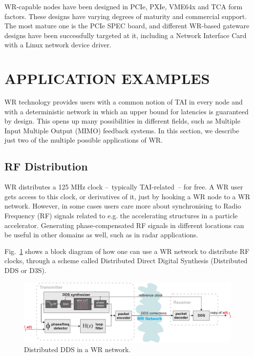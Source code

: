 \documentclass{../JAC2003}
\begin{document}
WR-capable nodes have been designed in PCIe, PXIe, VME64x and \textmu
TCA form factors. These designs have varying degrees of maturity and
commercial support. The most mature one is the PCIe SPEC board, and
different WR-based gateware designs have been successfully targeted
at it, including a Network Interface Card with a Linux network device
driver.

\section{APPLICATION EXAMPLES}

WR technology provides users with a common notion of TAI in every node
and with a deterministic network in which an upper bound for latencies
is guaranteed by design. This opens up many possibilities in different
fields, such as Multiple Input Multiple Output (MIMO) feedback
systems. In this section, we describe just two of the multiple
possible applications of WR.

\subsection{RF Distribution}

WR distributes a 125 MHz clock --~typically TAI-related~-- for free. A
WR user gets access to this clock, or derivatives of it, just by
hooking a WR node to a WR network. However, in some cases users care
more about synchronising to Radio Frequency (RF) signals related to
e.g. the accelerating structures in a particle accelerator. Generating
phase-compensated RF signals in different locations can be useful in
other domains as well, such as in radar applications.

Fig.~\ref{d3s-fig} shows a block diagram of how one can use a WR network
to distribute RF clocks, through a scheme called Distributed Direct
Digital Synthesis (Distributed DDS or D3S).    

\begin{figure}[htb]
   \centering
   \includegraphics*[width=\columnwidth]{applications/distributed_dds.pdf}
   \caption{Distributed DDS in a WR network.}
   \label{d3s-fig}
\end{figure}
\end{document}
